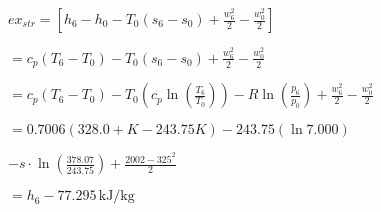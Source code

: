 \( ex_{str} = [h_6 - h_0 - T_0 (s_6 - s_0) + \frac{w_6^2}{2} - \frac{w_0^2}{2}] \)  

\( = c_p (T_6 - T_0) - T_0 (s_6 - s_0) + \frac{w_6^2}{2} - \frac{w_0^2}{2} \)  

\( = c_p (T_6 - T_0) - T_0 \left(c_p \ln \left(\frac{T_6}{T_0}\right)\right) - R \ln \left(\frac{p_6}{p_0}\right) + \frac{w_6^2}{2} - \frac{w_0^2}{2} \)  

\( = 0.7006 (328.0 + K - 243.75 K) - 243.75 \left(\ln 7.000\right) \)  

\( - s \cdot \ln \left(\frac{378.07}{243.75}\right) + \frac{2002 - 325^2}{2} \)  

\( = h_6 - 77.295 \, \text{kJ/kg} \)